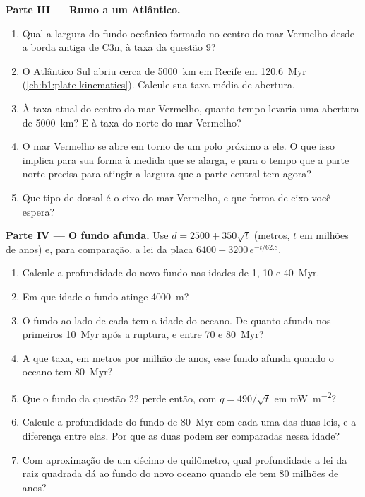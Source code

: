 \begin{problem}
\medskip
\noindent\textbf{Parte III --- Rumo a um Atlântico.}
\begin{enumerate}[resume]
  \item Qual a largura do fundo oceânico formado no centro do mar Vermelho desde a borda
        antiga de C3n, à taxa da questão 9?
  \item O Atlântico Sul abriu cerca de \qty{5000}{km} em Recife em
        \qty{120.6}{Myr} (\cref{ch:b1:plate-kinematics}). Calcule sua taxa média
        de abertura.
  \item À taxa atual do centro do mar Vermelho, quanto tempo levaria uma abertura
        de \qty{5000}{km}? E à taxa do norte do mar Vermelho?
  \item O mar Vermelho se abre em torno de um polo próximo a ele. O que isso implica para
        sua forma à medida que se alarga, e para o tempo que a parte norte precisa
        para atingir a largura que a parte central tem agora?
  \item Que tipo de dorsal é o eixo do mar Vermelho, e que forma de eixo você espera?
\end{enumerate}

\medskip
\noindent\textbf{Parte IV --- O fundo afunda.} Use $d = 2500 + 350\sqrt t$
(metros, $t$ em milhões de anos) e, para comparação, a lei da placa
$6400 - 3200\,e^{-t/62.8}$.
\begin{enumerate}[resume]
  \item Calcule a profundidade do novo fundo nas idades de 1, 10 e
        \qty{40}{Myr}.
  \item Em que idade o fundo atinge \qty{4000}{m}?
  \item O fundo ao lado de cada  tem a idade do oceano. De quanto afunda
        nos primeiros \qty{10}{Myr} após a ruptura, e entre
        70 e \qty{80}{Myr}?
  \item A que taxa, em metros por milhão de anos, esse fundo afunda quando o
        oceano tem \qty{80}{Myr}?
  \item Que  o fundo da questão 22 perde então, com
        $q = 490/\sqrt t$ em \unit{mW.m^{-2}}?
  \item Calcule a profundidade do fundo de \qty{80}{Myr} com cada uma das duas
        leis, e a diferença entre elas. Por que as duas podem ser comparadas nessa idade?
  \item Com aproximação de um décimo de quilômetro, qual profundidade a lei da raiz quadrada dá ao fundo do novo oceano quando ele tem 80 milhões de anos?
\end{enumerate}
\end{problem}
